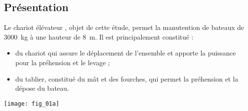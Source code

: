 \ifprof
\else
\begin{multicols}{2}
\fi

\subsection*{Présentation}
\ifprof
\else
Le chariot élévateur , objet de cette étude,  permet la manutention de bateaux de \SI{3000}{kg}
à une hauteur de \SI{8}{m}. Il est principalement constitué :
\begin{itemize}
\item du chariot qui assure le déplacement de l’ensemble et apporte la puissance pour la préhension
et le levage ;
\item du tablier, constitué du mât et des fourches, qui permet la préhension et la dépose du bateau.
\end{itemize}

\begin{center}
\texttt{[image: fig\_01a]}
\end{center} 




\end{multicols}
